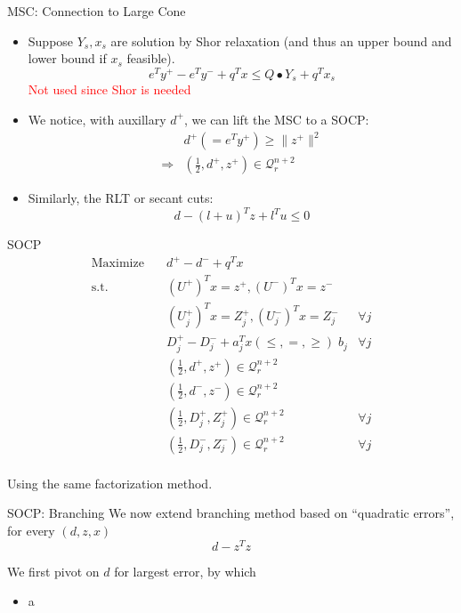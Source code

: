 \begin{frame}{MSC: Connection to Large Cone}
  \begin{itemize}
    \item Suppose \(Y_s, x_s\) are solution by Shor relaxation (and thus an upper bound and lower bound if \(x_s\) feasible).
          \[e^Ty^+ - e^Ty^- +  q^Tx \le Q\bullet Y_s  + q^T x_s\]
          \textcolor{red}{Not used since Shor is needed}
    \item We notice, with auxillary \(d^+\), we can lift the MSC to a SOCP:
          \[\begin{aligned}
                          & d^+ (= e^Ty^+) \ge \|z^+\|^2                    \\
              \Rightarrow & (\frac{1}{2}, d^+, z^+) \in \mathcal{Q}^{n+2}_r
            \end{aligned}
          \]
    \item Similarly, the RLT or secant cuts:
          \[
            d - (l + u)^Tz + l^Tu \le 0
          \]
  \end{itemize}

\end{frame}

\begin{frame}{SOCP}
  \[\begin{aligned}
      \mathrm{Maximize}\quad & d^+ - d^- + q^Tx                                                \\
      \mathrm{s.t.} \quad    & (U^+)^Tx = z^+, (U^-)^Tx = z^-                                  \\
                             & (U^+_j)^Tx = Z^+_j, (U^-_j)^Tx = Z^-_j              & \forall j \\
                             & D^+_j - D^-_j +  a_j^Tx (\le, =, \ge) \; b_j        & \forall j \\
                             & (\frac{1}{2}, d^+, z^+) \in \mathcal{Q}^{n+2}_r                 \\
                             & (\frac{1}{2}, d^-, z^-) \in \mathcal{Q}^{n+2}_r                 \\
                             & (\frac{1}{2}, D^+_j, Z^+_j) \in \mathcal{Q}^{n+2}_r & \forall j \\
                             & (\frac{1}{2}, D^-_j, Z^-_j) \in \mathcal{Q}^{n+2}_r & \forall j \\
    \end{aligned}\]

  Using the same factorization method.
\end{frame}

\begin{frame}{SOCP: Branching}
  We now extend branching method based on ``quadratic errors'', for every \((d, z, x)\)
  \[ d - z^Tz\]

  We first pivot on \(d\) for largest error, by which 
  \begin{itemize}
    \item a
  \end{itemize}
\end{frame}

